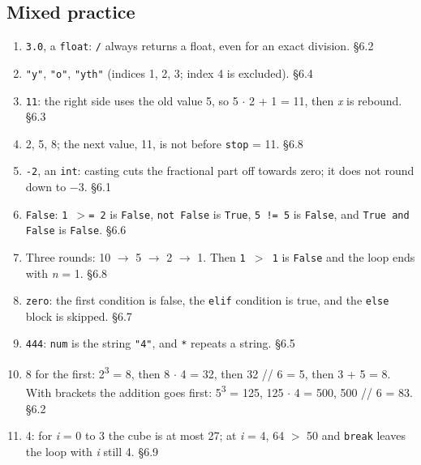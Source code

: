 \documentclass[11pt]{article}
\begin{document}
\begin{keepsection}\subsection{Mixed practice}

\begin{enumerate}
\item \texttt{3.0}, a \texttt{float}: \texttt{/} always returns a float, even for an exact division. \hfill{\small\color{FAUblue}§6.2}
\item \texttt{"y"}, \texttt{"o"}, \texttt{"yth"} (indices 1, 2, 3; index 4 is excluded). \hfill{\small\color{FAUblue}§6.4}
\item \texttt{11}: the right side uses the old value 5, so 5 \ensuremath{\cdot} 2 + 1 = 11, then \textit{x} is rebound. \hfill{\small\color{FAUblue}§6.3}
\item 2, 5, 8; the next value, 11, is not before \texttt{stop} = 11. \hfill{\small\color{FAUblue}§6.8}
\item \texttt{-2}, an \texttt{int}: casting cuts the fractional part off towards zero; it does not round down to \ensuremath{-}3. \hfill{\small\color{FAUblue}§6.1}
\item \texttt{False}: \texttt{1 \ensuremath{>}= 2} is \texttt{False}, \texttt{not False} is \texttt{True}, \texttt{5 != 5} is \texttt{False}, and \texttt{True and False} is \texttt{False}. \hfill{\small\color{FAUblue}§6.6}
\item Three rounds: 10 \ensuremath{\to} 5 \ensuremath{\to} 2 \ensuremath{\to} 1. Then \texttt{1 \ensuremath{>} 1} is \texttt{False} and the loop ends with \textit{n} = 1. \hfill{\small\color{FAUblue}§6.8}
\item \texttt{zero}: the first condition is false, the \texttt{elif} condition is true, and the \texttt{else} block is skipped. \hfill{\small\color{FAUblue}§6.7}
\item \texttt{444}: \texttt{num} is the string \texttt{"4"}, and \texttt{*} repeats a string. \hfill{\small\color{FAUblue}§6.5}
\item 8 for the first: 2\textsuperscript{3} = 8, then 8 \ensuremath{\cdot} 4 = 32, then 32 // 6 = 5, then 3 + 5 = 8. With brackets the addition goes first: 5\textsuperscript{3} = 125, 125 \ensuremath{\cdot} 4 = 500, 500 // 6 = 83. \hfill{\small\color{FAUblue}§6.2}
\item 4: for \textit{i} = 0 to 3 the cube is at most 27; at \textit{i} = 4, 64 \ensuremath{>} 50 and \texttt{break} leaves the loop with \textit{i} still 4. \hfill{\small\color{FAUblue}§6.9}

\end{enumerate}
\end{keepsection}
\end{document}
